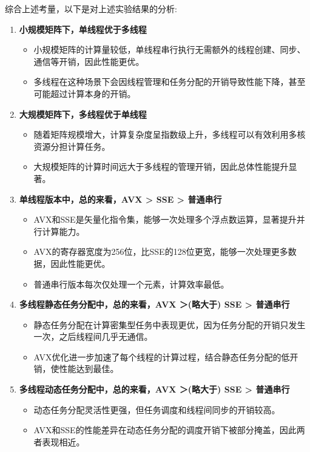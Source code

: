 \documentclass{nku}
\begin{document}
综合上述考量，以下是对上述实验结果的分析:
\begin{enumerate}
    \item \textbf{小规模矩阵下，单线程优于多线程}
    \begin{itemize}
        \item 小规模矩阵的计算量较低，单线程串行执行无需额外的线程创建、同步、通信等开销，因此性能更优。
        \item 多线程在这种场景下会因线程管理和任务分配的开销导致性能下降，甚至可能超过计算本身的开销。
    \end{itemize}

    \item \textbf{大规模矩阵下，多线程优于单线程}
    \begin{itemize}
        \item 随着矩阵规模增大，计算复杂度呈指数级上升，多线程可以有效利用多核资源分担计算任务。
        \item 大规模矩阵的计算时间远大于多线程的管理开销，因此总体性能提升显著。
    \end{itemize}

    \item \textbf{单线程版本中，总的来看，AVX > SSE > 普通串行}
    \begin{itemize}
        \item AVX和SSE是矢量化指令集，能够一次处理多个浮点数运算，显著提升并行计算能力。
        \item AVX的寄存器宽度为256位，比SSE的128位更宽，能够一次处理更多数据，因此性能更优。
        \item 普通串行版本每次仅处理一个元素，计算效率最低。
    \end{itemize}

    \item \textbf{多线程静态任务分配中，总的来看，AVX ＞(略大于) SSE > 普通串行}
    \begin{itemize}
        \item 静态任务分配在计算密集型任务中表现更优，因为任务分配的开销只发生一次，之后线程间几乎无通信。
        \item AVX优化进一步加速了每个线程的计算过程，结合静态任务分配的低开销，使性能达到最佳。
    \end{itemize}

    \item \textbf{多线程动态任务分配中，总的来看，AVX ＞(略大于) SSE > 普通串行}
    \begin{itemize}
        \item 动态任务分配灵活性更强，但任务调度和线程间同步的开销较高。
        \item AVX和SSE的性能差异在动态任务分配的调度开销下被部分掩盖，因此两者表现相近。
    \end{itemize}


\end{enumerate}
\end{document}

